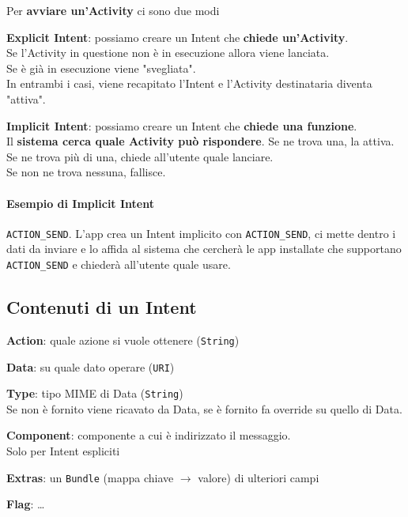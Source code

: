 \documentclass[10pt]{book}
\begin{document}
\pagebreak
Per \textbf{avviare un'Activity} ci sono due modi
\begin{multicols}{2}
\begin{list}{}{}
	\item \textbf{Explicit Intent}: possiamo creare un Intent che \textbf{chiede un'Activity}.\\
	Se l'Activity in questione non è in esecuzione allora viene lanciata.\\
	Se è già in esecuzione viene "svegliata".\\
	In entrambi i casi, viene recapitato l'Intent e l'Activity destinataria diventa "attiva".
	\columnbreak
	\item \textbf{Implicit Intent}: possiamo creare un Intent che \textbf{chiede una funzione}.\\
	Il \textbf{sistema cerca quale Activity può rispondere}. Se ne trova una, la attiva.\\
	Se ne trova più di una, chiede all'utente quale lanciare.\\
	Se non ne trova nessuna, fallisce.
\end{list}
\end{multicols}
\paragraph{Esempio di Implicit Intent} \texttt{ACTION\_SEND}. L'app crea un Intent implicito con \texttt{ACTION\_SEND}, ci mette dentro i dati da inviare e lo affida al sistema che cercherà le app installate che supportano \texttt{ACTION\_SEND} e chiederà all'utente quale usare.
\subsection{Contenuti di un Intent}
\begin{list}{}{}
	\item \textbf{Action}: quale azione si vuole ottenere (\texttt{String})
	\item \textbf{Data}: su quale dato operare (\texttt{URI})
	\item \textbf{Type}: tipo MIME di Data (\texttt{String})\\
	Se non è fornito viene ricavato da Data, se è fornito fa override su quello di Data.
	\item \textbf{Component}: componente a cui è indirizzato il messaggio.\\
	Solo per Intent espliciti
	\item \textbf{Extras}: un \texttt{Bundle} (mappa chiave $\rightarrow$ valore) di ulteriori campi
	\item \textbf{Flag}: \ldots
\end{list}
\end{document}
